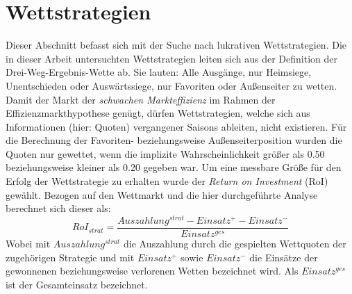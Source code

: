 \section{Wettstrategien}
Dieser Abschnitt befasst sich mit der Suche nach lukrativen Wettstrategien. Die in dieser Arbeit untersuchten Wettstrategien leiten sich aus der Definition der Drei-Weg-Ergebnis-Wette ab. Sie lauten: Alle Ausgänge, nur Heimsiege, Unentschieden oder Auswärtssiege, nur Favoriten oder Außenseiter zu wetten. Damit der Markt der \textit{schwachen Markteffizienz} im Rahmen der Effizienzmarkthypothese genügt, dürfen Wettstrategien, welche sich aus Informationen (hier: Quoten) vergangener Saisons ableiten, nicht existieren. Für die Berechnung der Favoriten- beziehungsweise Außenseiterposition wurden die Quoten nur gewettet, wenn die implizite Wahrscheinlichkeit größer als 0.50 beziehungsweise kleiner als 0.20 gegeben war. Um eine messbare Größe für den Erfolg der Wettstrategie zu erhalten wurde der \textit{Return on Investment} (RoI) gewählt. Bezogen auf den Wettmarkt und die hier durchgeführte Analyse berechnet sich dieser als: \[ RoI_{strat} = \frac{Auszahlung^{strat} - Einsatz^{+} - Einsatz^{-}}{Einsatz^{ges}} \] Wobei mit $ Auszahlung^{strat} $ die Auszahlung durch die gespielten Wettquoten der zugehörigen Strategie und mit $ Einsatz^{+} $ sowie $ Einsatz^{-} $ die Einsätze der gewonnenen beziehungsweise verlorenen Wetten bezeichnet wird. Als $ Einsatz^{ges} $ ist der Gesamteinsatz bezeichnet.


